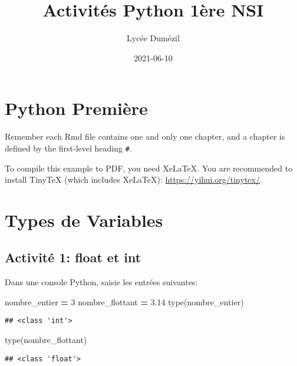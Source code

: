 \documentclass[
]{book}
\title{Activités Python 1ère NSI}
\author{Lycée Dumézil}
\date{2021-06-10}
\newenvironment{Shaded}{\begin{snugshade}}{\end{snugshade}}
\newcommand{\BuiltInTok}[1]{#1}
\newcommand{\DecValTok}[1]{\textcolor[rgb]{0.00,0.00,0.81}{#1}}
\newcommand{\FloatTok}[1]{\textcolor[rgb]{0.00,0.00,0.81}{#1}}
\newcommand{\NormalTok}[1]{#1}
\newcommand{\OperatorTok}[1]{\textcolor[rgb]{0.81,0.36,0.00}{\textbf{#1}}}
\begin{document}
\maketitle

{
\setcounter{tocdepth}{1}
\tableofcontents
}
\hypertarget{python-premiuxe8re}{%
\chapter*{Python Première}\label{python-premiuxe8re}}

Remember each Rmd file contains one and only one chapter, and a chapter is defined by the first-level heading \texttt{\#}.

To compile this example to PDF, you need XeLaTeX. You are recommended to install TinyTeX (which includes XeLaTeX): \url{https://yihui.org/tinytex/}.

\hypertarget{types-de-variables}{%
\chapter{Types de Variables}\label{types-de-variables}}

\hypertarget{activituxe9-1-float-et-int}{%
\section{Activité 1: float et int}\label{activituxe9-1-float-et-int}}

Dans une console Python, saisie les entrées suivantes:

\begin{Shaded}
\begin{Highlighting}[]
\NormalTok{nombre\_entier }\OperatorTok{=} \DecValTok{3} 
\NormalTok{nombre\_flottant }\OperatorTok{=} \FloatTok{3.14}
\BuiltInTok{type}\NormalTok{(nombre\_entier)}
\end{Highlighting}
\end{Shaded}

\begin{verbatim}
## <class 'int'>
\end{verbatim}

\begin{Shaded}
\begin{Highlighting}[]
\BuiltInTok{type}\NormalTok{(nombre\_flottant)}
\end{Highlighting}
\end{Shaded}

\begin{verbatim}
## <class 'float'>
\end{verbatim}
\end{document}
